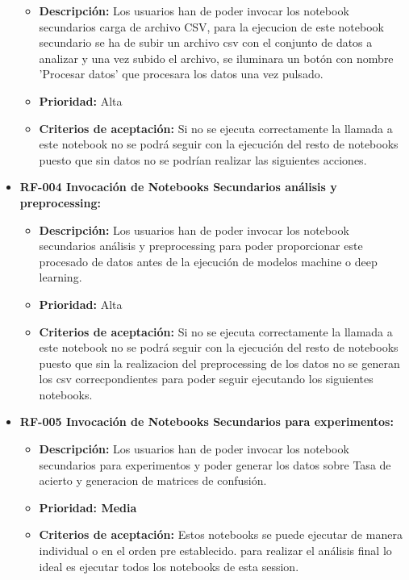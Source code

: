 \begin{itemize}
  \begin{itemize}
  \tightlist
  \item
    \textbf{Descripción:} Los usuarios han de poder invocar los notebook secundarios carga de archivo CSV, para la ejecucion de este notebook secundario se ha de subir un archivo csv con el conjunto de datos a analizar y una vez subido el archivo, se iluminara un botón con nombre 'Procesar datos' que procesara los datos una vez pulsado.
  \item
    \textbf{Prioridad:} Alta
  \item
    \textbf{Criterios de aceptación:} Si no se ejecuta correctamente la llamada a este notebook no se podrá seguir con la ejecución del resto de notebooks puesto que sin datos no se podrían realizar las siguientes acciones. 
  \end{itemize}


\item
  \textbf{RF-004 Invocación de Notebooks Secundarios análisis y preprocessing:}
  
  \begin{itemize}
  \tightlist
  \item
   \textbf{Descripción:} Los usuarios han de poder invocar los notebook secundarios análisis y preprocessing para poder proporcionar este procesado de datos antes de la ejecución de modelos machine o deep learning.
  \item  
   \textbf{Prioridad:} Alta
  \item  
   \textbf{Criterios de aceptación:} Si no se ejecuta correctamente la llamada a este notebook no se podrá seguir con la ejecución del resto de notebooks puesto que sin la realizacion del preprocessing de los datos no se generan los csv correcpondientes para poder seguir ejecutando los siguientes notebooks.
  \end{itemize}


\item
  \textbf{RF-005 Invocación de Notebooks Secundarios para experimentos:}

  \begin{itemize}
  \tightlist
  \item
   \textbf{Descripción:} Los usuarios han de poder invocar los notebook secundarios para experimentos y poder generar los datos sobre Tasa de acierto y generacion de matrices de confusión.
  \item  
   \textbf{Prioridad: Media}
  \item  
   \textbf{Criterios de aceptación:} Estos notebooks se puede ejecutar de manera individual o en el orden pre establecido. para realizar el análisis final lo ideal es ejecutar todos los notebooks de esta session.
	\textbf{}
  \end{itemize}


\end{itemize}
